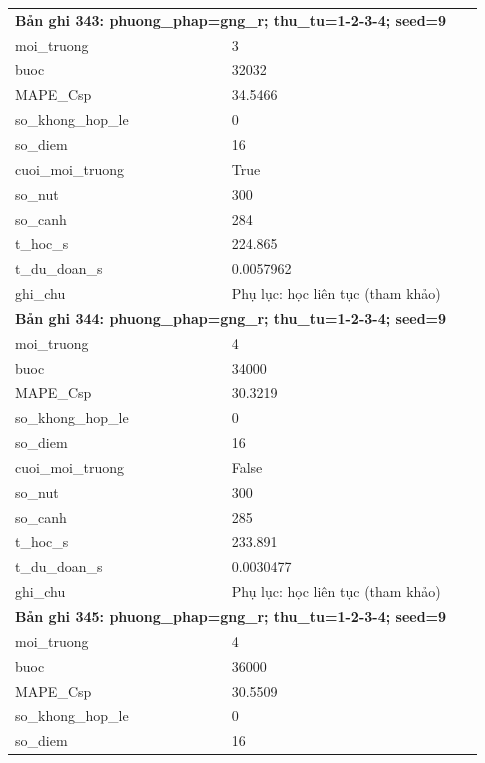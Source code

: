 \begin{longtable}{p{0.43\linewidth}p{0.50\linewidth}}
\midrule
\multicolumn{2}{p{0.95\linewidth}}{\textbf{Bản ghi 343: phuong\_phap=gng\_r; thu\_tu=1-2-3-4; seed=9}} \\
moi\_\allowbreak truong & 3 \\
buoc & 32032 \\
MAPE\_\allowbreak Csp & 34.5466 \\
so\_\allowbreak khong\_\allowbreak hop\_\allowbreak le & 0 \\
so\_\allowbreak diem & 16 \\
cuoi\_\allowbreak moi\_\allowbreak truong & True \\
so\_\allowbreak nut & 300 \\
so\_\allowbreak canh & 284 \\
t\_\allowbreak hoc\_\allowbreak s & 224.865 \\
t\_\allowbreak du\_\allowbreak doan\_\allowbreak s & 0.0057962 \\
ghi\_\allowbreak chu & Phụ lục: học liên tục (tham khảo) \\
\midrule
\multicolumn{2}{p{0.95\linewidth}}{\textbf{Bản ghi 344: phuong\_phap=gng\_r; thu\_tu=1-2-3-4; seed=9}} \\
moi\_\allowbreak truong & 4 \\
buoc & 34000 \\
MAPE\_\allowbreak Csp & 30.3219 \\
so\_\allowbreak khong\_\allowbreak hop\_\allowbreak le & 0 \\
so\_\allowbreak diem & 16 \\
cuoi\_\allowbreak moi\_\allowbreak truong & False \\
so\_\allowbreak nut & 300 \\
so\_\allowbreak canh & 285 \\
t\_\allowbreak hoc\_\allowbreak s & 233.891 \\
t\_\allowbreak du\_\allowbreak doan\_\allowbreak s & 0.0030477 \\
ghi\_\allowbreak chu & Phụ lục: học liên tục (tham khảo) \\
\midrule
\multicolumn{2}{p{0.95\linewidth}}{\textbf{Bản ghi 345: phuong\_phap=gng\_r; thu\_tu=1-2-3-4; seed=9}} \\
moi\_\allowbreak truong & 4 \\
buoc & 36000 \\
MAPE\_\allowbreak Csp & 30.5509 \\
so\_\allowbreak khong\_\allowbreak hop\_\allowbreak le & 0 \\
so\_\allowbreak diem & 16 \\

\end{longtable}

